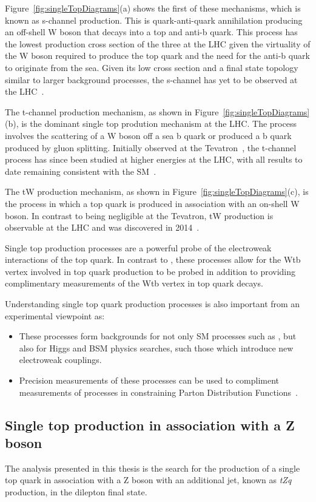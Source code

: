 Figure~\ref{fig:singleTopDiagrams}(a) shows the first of these mechanisms, which is known as s-channel production. 
This is quark-anti-quark annihilation producing an off-shell W boson that decays into a top and anti-b quark.
This process has the lowest production cross section of the three at the LHC given the virtuality of the W boson required to produce the top quark and the need for the anti-b quark to originate from the sea.
Given its low cross section and a final state topology similar to larger background processes, the s-channel has yet to be observed at the LHC~\cite{Khachatryan:2016ewo}.

The t-channel production mechanism, as shown in Figure~\ref{fig:singleTopDiagrams}(b), is the dominant single top prodution mechanism at the LHC.
The process involves the scattering of a W boson off a sea b quark or produced a b quark produced by gluon splitting.
Initially observed at the Tevatron~\cite{Aaltonen:2009jj,Abazov:2009ii}, the t-channel process has since been studied at higher energies at the LHC, with all results to date remaining consistent with the SM~\cite{Berta:2017ghf,Morton:2018wkb}.	

The tW production mechanism, as shown in Figure~\ref{fig:singleTopDiagrams}(c), is the process in which  a top quark is produced in association with an on-shell W boson.
In contrast to being negligible at the Tevatron, tW production is observable at the LHC and was discovered in 2014~\cite{Chatrchyan:2014tua}.

Single top production processes are a powerful probe of the electroweak interactions of the top quark.
In contrast to \ttbar, these processes allow for the Wtb vertex involved in top quark production to be probed in addition to providing complimentary measurements of the Wtb vertex in top quark decays.

Understanding single top quark production processes is also important from an experimental viewpoint as:
\begin{itemize}
\item These processes form backgrounds for not only SM processes such as \ttbar, but also for Higgs and BSM physics searches, such those which introduce new electroweak couplings.
\item Precision measurements of these processes can be used to compliment measurements of \ttbar processes in constraining Parton Distribution Functions~\cite{Guffanti:2010yu}.
\end{itemize}


\subsection{Single top production in association with a Z boson}\label{subsec:tZqTheory}
The analysis presented in this thesis is the search for the production of a single top quark in association with a Z boson with an additional jet, known as \emph{tZq} production, in the dilepton final state.

